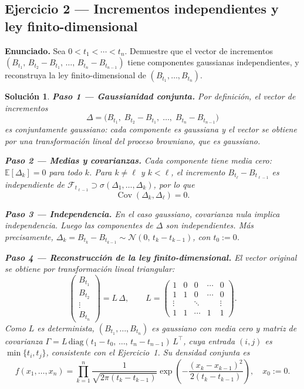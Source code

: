\documentclass[12pt,letterpaper]{article}
\theoremstyle{ejercicio}
\theoremstyle{solucion}
\newtheorem*{solucion}{Solución}
\newcommand{\E}{\mathbb{E}}
\newcommand{\Cov}{\operatorname{Cov}}
\newcommand{\F}{\mathcal{F}}
\begin{document}
\subsection*{Ejercicio 2 — Incrementos independientes y ley finito-dimensional}

\begin{recuadro}
\textbf{Enunciado.} Sea $0<t_1<\cdots<t_n$. Demuestre que el vector de incrementos
$(B_{t_1},\,B_{t_2}-B_{t_1},\,\ldots,\,B_{t_n}-B_{t_{n-1}})$
tiene componentes gaussianas independientes, y reconstruya la ley finito-dimensional de
$(B_{t_1},\ldots,B_{t_n})$.
\end{recuadro}

\begin{solucion}

\textbf{Paso 1 — Gaussianidad conjunta.}
Por definición, el vector de incrementos
\[
  \Delta = \bigl(B_{t_1},\;B_{t_2}-B_{t_1},\;\ldots,\;B_{t_n}-B_{t_{n-1}}\bigr)
\]
es conjuntamente gaussiano: cada componente es gaussiana y el vector se obtiene por una
transformación lineal del proceso browniano, que es gaussiano.

\textbf{Paso 2 — Medias y covarianzas.}
Cada componente tiene media cero: $\E[\Delta_k]=0$ para todo $k$.
Para $k\ne \ell$ y $k<\ell$, el incremento $B_{t_\ell}-B_{t_{\ell-1}}$ es independiente de
$\F_{t_{\ell-1}}\supset\sigma(\Delta_1,\dots,\Delta_k)$, por lo que
\[
  \Cov(\Delta_k,\Delta_\ell) = 0.
\]

\textbf{Paso 3 — Independencia.}
En el caso gaussiano, covarianza nula implica independencia. Luego las componentes de $\Delta$
son independientes. Más precisamente, $\Delta_k=B_{t_k}-B_{t_{k-1}}\sim\mathcal{N}(0,\,t_k-t_{k-1})$, con $t_0:=0$.

\textbf{Paso 4 — Reconstrucción de la ley finito-dimensional.}
El vector original se obtiene por transformación lineal triangular:
\[
  \begin{pmatrix}B_{t_1}\\ B_{t_2}\\ \vdots\\ B_{t_n}\end{pmatrix}
  = L\,\Delta,
  \qquad
  L =
  \begin{pmatrix}
    1 & 0 & 0 &\cdots & 0\\
    1 & 1 & 0 &\cdots & 0\\
    \vdots &   & \ddots & & \vdots\\
    1 & 1 & \cdots & 1 & 1
  \end{pmatrix}.
\]
Como $L$ es determinista, $(B_{t_1},\dots,B_{t_n})$ es gaussiano con media cero y matriz de
covarianza $\Gamma=L\,\mathrm{diag}(t_1-t_0,\,\ldots,\,t_n-t_{n-1})\,L^\top$,
cuya entrada $(i,j)$ es $\min\{t_i,t_j\}$, consistente con el Ejercicio~1.
Su densidad conjunta es
\[
  f(x_1,\dots,x_n)
  = \prod_{k=1}^{n}
    \frac{1}{\sqrt{2\pi(t_k-t_{k-1})}}
    \exp\!\left(-\frac{(x_k-x_{k-1})^2}{2(t_k-t_{k-1})}\right),
  \quad x_0:=0.
\]
\end{solucion}
\end{document}

